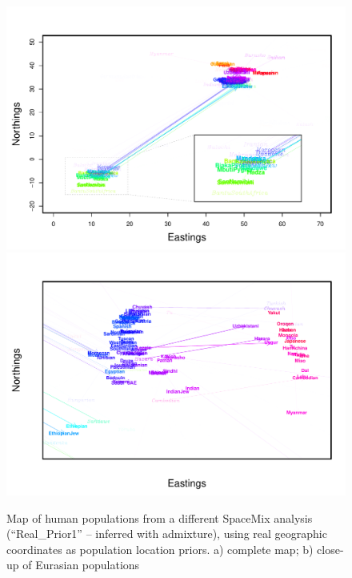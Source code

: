 \documentclass[10pt,letterpaper]{article}
\begin{document}
\begin{figure}
	\centering
			{\includegraphics[height=.45\textheight]{../figs/globetrotter/globe_Ad_map_AfricaInset_realpr2.pdf}}
			{\includegraphics[height=.45\textheight]{../figs/globetrotter/eurasia_Ad_map_indproc_realpr2.pdf}}
	\caption{Map of human populations from a different SpaceMix analysis (``Real\_Prior1'' -- inferred with admixture), using real geographic coordinates as population location priors. a) complete map; b) close-up of Eurasian populations}
	\label{sfig:globe_ad_maps_realpr2}
\end{figure}

\clearpage
\end{document}
